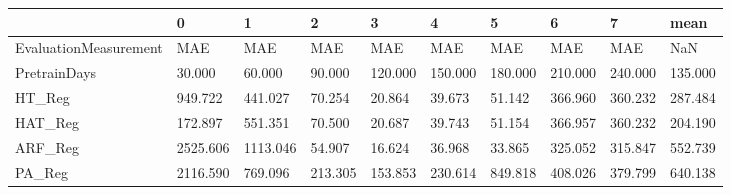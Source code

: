 \begin{tabular}{llllllllll}
\toprule
{} &        0 &        1 &       2 &       3 &       4 &       5 &       6 &       7 &    mean \\
\midrule
EvaluationMeasurement &      MAE &      MAE &     MAE &     MAE &     MAE &     MAE &     MAE &     MAE &     NaN \\
PretrainDays          &   30.000 &   60.000 &  90.000 & 120.000 & 150.000 & 180.000 & 210.000 & 240.000 & 135.000 \\
HT\_Reg                &  949.722 &  441.027 &  70.254 &  20.864 &  39.673 &  51.142 & 366.960 & 360.232 & 287.484 \\
HAT\_Reg               &  172.897 &  551.351 &  70.500 &  20.687 &  39.743 &  51.154 & 366.957 & 360.232 & 204.190 \\
ARF\_Reg               & 2525.606 & 1113.046 &  54.907 &  16.624 &  36.968 &  33.865 & 325.052 & 315.847 & 552.739 \\
PA\_Reg                & 2116.590 &  769.096 & 213.305 & 153.853 & 230.614 & 849.818 & 408.026 & 379.799 & 640.138 \\
\bottomrule
\end{tabular}
